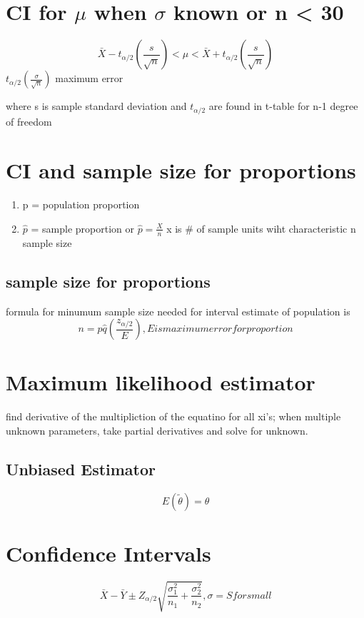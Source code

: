 \documentclass[11pt]{article}
\begin{document}
\section{CI for $\mu$ when $\sigma $ known or n < 30}
\begin{equation}
  \bar X - t_{\alpha/2}(\frac{s}{\sqrt{n}}) < \mu < \bar X
  +t_{\alpha/2}(\frac{s}{\sqrt{n}})
\end{equation}
$t_{\alpha/2}(\frac{\sigma}{\sqrt{n}})$  maximum error
\par where s is sample standard deviation and $t_{\alpha/2}$ are found in
t-table for n-1 degree of freedom
\section{CI and sample size for proportions}
\begin{enumerate}
  \item p = population proportion
  \item $\hat{p}$ = sample proportion or $\hat{p}= \frac{X}{n}$ x is \# of sample
    units wiht characteristic n sample size
\end{enumerate}
\subsection{sample size for proportions}
formula for minumum sample size needed for interval estimate of population
is
\begin{equation}
  n = \hat{p} \hat{q} (\frac{z_{\alpha/2}}{E}) , E is maximum error forproportion
\end{equation}
\section{Maximum likelihood estimator}
\par find derivative of the multipliction of the equatino for all
xi's; when multiple unknown parameters, take partial derivatives and
solve for unknown.
\subsection{Unbiased Estimator}
\begin{equation}
  E(\tilde{\theta}) = \theta
\end{equation}
\section{Confidence Intervals}
\begin{equation}
  \bar{X} - \bar{Y} \pm
  Z_{\alpha/2}\sqrt{\frac{\sigma_1^2}{n_1}+\frac{\sigma_2^2}{n_2}}, \sigma = S
  for small
\end{equation}
\end{document}
